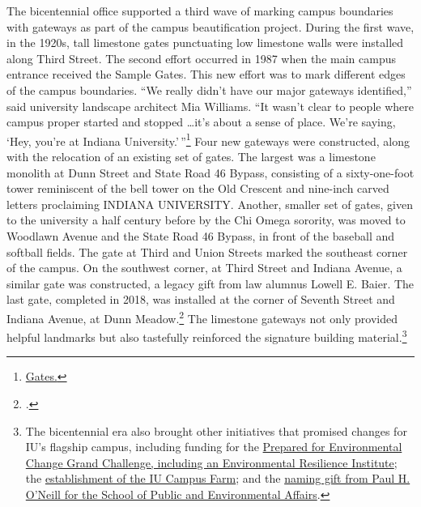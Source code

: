 \documentclass[
  american,
  letterpaper,
]{scrreprt}
\begin{document}
The bicentennial office supported a third wave of marking campus
boundaries with gateways as part of the campus beautification project.
During the first wave, in the 1920s, tall limestone gates punctuating
low limestone walls were installed along Third Street. The second effort
occurred in 1987 when the main campus entrance received the Sample
Gates. This new effort was to mark different edges of the campus
boundaries. ``We really didn't have our major gateways identified,''
said university landscape architect Mia Williams. ``It wasn't clear to
people where campus proper started and stopped \ldots it's about a sense
of place. We're saying, `Hey, you're at Indiana
University.'\,''\footnote{\href{https://web.archive.org/web/20201014090439/https://200.iu.edu/signature-projects/heritage-art-campus/campus-beautification/gates.html}{Gates.}}
Four new gateways were constructed, along with the relocation of an
existing set of gates. The largest was a limestone monolith at Dunn
Street and State Road 46 Bypass, consisting of a sixty-one-foot tower
reminiscent of the bell tower on the Old Crescent and nine-inch carved
letters proclaiming INDIANA UNIVERSITY. Another, smaller set of gates,
given to the university a half century before by the Chi Omega sorority,
was moved to Woodlawn Avenue and the State Road 46 Bypass, in front of
the baseball and softball fields. The gate at Third and Union Streets
marked the southeast corner of the campus. On the southwest corner, at
Third Street and Indiana Avenue, a similar gate was constructed, a
legacy gift from law alumnus Lowell E. Baier. The last gate, completed
in 2018, was installed at the corner of Seventh Street and Indiana
Avenue, at Dunn Meadow.\footnote{.}
The limestone gateways not only provided helpful landmarks but also
tastefully reinforced the signature building material.\footnote{The
  bicentennial era also brought other initiatives that promised changes
  for IU's flagship campus, including funding for the
  \href{https://news.iu.edu/stories/2017/05/iu/releases/10-grand-challenges.html}{Prepared
  for Environmental Change Grand Challenge, including an Environmental
  Resilience Institute}; the
  \href{https://news.iu.edu/stories/2017/10/iub/inside/31-campus-farm.html}{establishment
  of the IU Campus Farm}; and the
  \href{https://news.iu.edu/stories/2019/03/iu/releases/04-school-of-public-and-environmental-affairs-named-for-paul-oneill.html}{naming
  gift from Paul H. O'Neill for the School of Public and Environmental
  Affairs}.}
\end{document}

